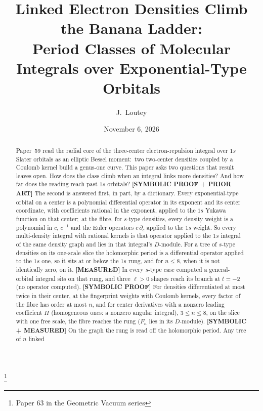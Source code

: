 \documentclass[aps,pra,twocolumn,superscriptaddress,longbibliography]{revtex4-2}
\begin{document}
\title{Linked Electron Densities Climb the Banana Ladder:\\
Period Classes of Molecular Integrals over Exponential-Type Orbitals}
\thanks{Paper 63 in the Geometric Vacuum series}

\author{J.~Loutey}

\date{November 6, 2026}


\begin{abstract}
Paper~59 read the radial core of the three-center electron-repulsion
integral over $1s$ Slater orbitals as an elliptic Bessel moment:\ two
two-center densities coupled by a Coulomb kernel build a genus-one curve.
This paper asks two questions that result leaves open.  How does the class
climb when an integral links more densities?  And how far does the reading
reach past $1s$ orbitals?  \textbf{[SYMBOLIC PROOF + PRIOR ART]} The
second is answered first, in part, by a dictionary.  Every exponential-type orbital
on a center is a polynomial differential operator in its exponent and its
center coordinate, with coefficients rational in the exponent, applied to
the $1s$ Yukawa function on that center;\ at the fibre, for $s$-type
densities, every density weight is a polynomial in $c$, $c^{-1}$ and the
Euler operators $c\,\partial_c$ applied to the $1s$ weight.  So every multi-density integral with rational kernels is that
operator applied to the $1s$ integral of the same density graph and lies in
that integral's $D$-module.  For a tree of $s$-type densities on its
one-scale slice the holomorphic period is a differential operator applied to
the $1s$ one, so it sits at or below the $1s$ rung, and for $n\le8$, when it
is not identically zero, on it.  \textbf{[MEASURED]} In every $s$-type case computed a general-orbital integral sits on that rung, and three $\ell>0$ shapes reach its branch at $t=-2$ (no operator computed).  \textbf{[SYMBOLIC PROOF]} For densities differentiated at most twice in their center, at the fingerprint weights with Coulomb kernels, every factor of the fibre has order at most $n$, and for center derivatives with a nonzero leading coefficient $\Pi$ (homogeneous ones: a nonzero angular integral), $3\le n\le8$, on the slice with one free scale, the fibre reaches the rung ($F_n$ lies in its $D$-module).  \textbf{[SYMBOLIC + MEASURED]} On the graph the
rung is read off the holomorphic period.  Any tree of $n$ linked

\end{abstract}
\end{document}

